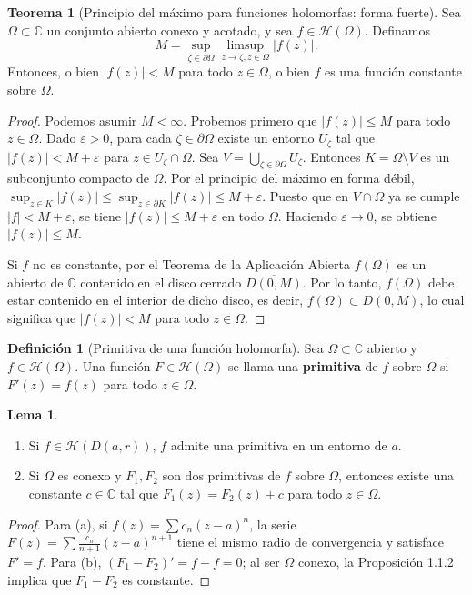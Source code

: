 \documentclass[11pt,a4paper]{article}
\theoremstyle{definition}
\newtheorem{definicion}{Definición}[section]
\newtheorem{teorema}{Teorema}[section]
\newtheorem{lema}{Lema}[section]
\theoremstyle{remark}
\numberwithin{equation}{section}
\begin{document}
\begin{teorema}[Principio del máximo para funciones holomorfas: forma fuerte]
Sea $\Omega \subset \mathbb{C}$ un conjunto abierto conexo y acotado, y sea $f \in \mathcal{H}(\Omega)$. Definamos
\begin{equation}
M = \sup_{\zeta \in \partial \Omega} \limsup_{z \to \zeta, z \in \Omega} |f(z)|.
\end{equation}
Entonces, o bien $|f(z)| < M$ para todo $z \in \Omega$, o bien $f$ es una función constante sobre $\Omega$.
\end{teorema}
\begin{proof}
Podemos asumir $M < \infty$. Probemos primero que $|f(z)| \le M$ para todo $z \in \Omega$. Dado $\varepsilon > 0$, para cada $\zeta \in \partial \Omega$ existe un entorno $U_\zeta$ tal que $|f(z)| < M + \varepsilon$ para $z \in U_\zeta \cap \Omega$. Sea $V = \bigcup_{\zeta \in \partial \Omega} U_\zeta$. Entonces $K = \Omega \setminus V$ es un subconjunto compacto de $\Omega$. Por el principio del máximo en forma débil, $\sup_{z \in K} |f(z)| \le \sup_{z \in \partial K} |f(z)| \le M+\varepsilon$. Puesto que en $V \cap \Omega$ ya se cumple $|f| < M+\varepsilon$, se tiene $|f(z)| \le M+\varepsilon$ en todo $\Omega$. Haciendo $\varepsilon \to 0$, se obtiene $|f(z)| \le M$.

Si $f$ no es constante, por el Teorema de la Aplicación Abierta $f(\Omega)$ es un abierto de $\mathbb{C}$ contenido en el disco cerrado $\overline{D(0,M)}$. Por lo tanto, $f(\Omega)$ debe estar contenido en el interior de dicho disco, es decir, $f(\Omega) \subset D(0,M)$, lo cual significa que $|f(z)| < M$ para todo $z \in \Omega$.
\end{proof}

\begin{definicion}[Primitiva de una función holomorfa]
Sea $\Omega \subset \mathbb{C}$ abierto y $f \in \mathcal{H}(\Omega)$. Una función $F \in \mathcal{H}(\Omega)$ se llama una \textbf{primitiva} de $f$ sobre $\Omega$ si $F'(z) = f(z)$ para todo $z \in \Omega$.
\end{definicion}

\begin{lema}
\begin{enumerate}
\item[(a)] Si $f \in \mathcal{H}(D(a,r))$, $f$ admite una primitiva en un entorno de $a$.
\item[(b)] Si $\Omega$ es conexo y $F_1, F_2$ son dos primitivas de $f$ sobre $\Omega$, entonces existe una constante $c \in \mathbb{C}$ tal que $F_1(z) = F_2(z) + c$ para todo $z \in \Omega$.
\end{enumerate}
\end{lema}
\begin{proof}
Para (a), si $f(z) = \sum c_n (z-a)^n$, la serie $F(z) = \sum \frac{c_n}{n+1}(z-a)^{n+1}$ tiene el mismo radio de convergencia y satisface $F' = f$. Para (b), $(F_1 - F_2)' = f - f = 0$; al ser $\Omega$ conexo, la Proposición 1.1.2 implica que $F_1 - F_2$ es constante.
\end{proof}
\end{document}
